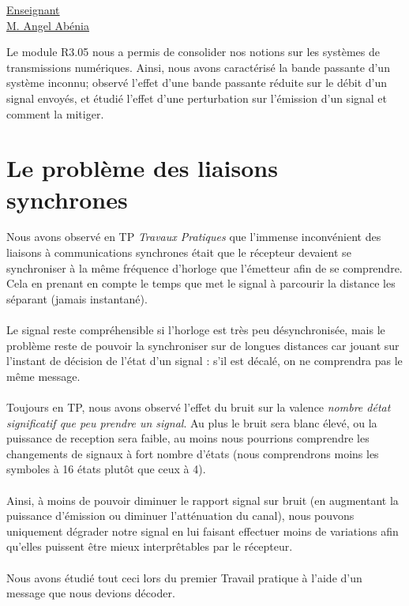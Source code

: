 \renewcommand{\figurename}{}

\vspace*{0.2cm}%
      \large
      \href{}{\color{black}Enseignant\\M. Angel Abénia}\\%
      \normalsize
\vspace*{0.5cm}%

Le module R3.05 nous a permis de consolider nos notions sur les systèmes de transmissions numériques. Ainsi, nous avons caractérisé la bande passante d'un système inconnu; observé l'effet d'une bande passante réduite sur le débit d'un signal envoyés, et étudié l'effet d'une perturbation sur l'émission d'un signal et comment la mitiger.

\section{Le problème des liaisons synchrones}

Nous avons observé en TP \textit{Travaux Pratiques} que l'immense inconvénient des liaisons à communications synchrones était que le récepteur devaient se synchroniser à la même fréquence d'horloge que l’émetteur afin de se comprendre. Cela en prenant en compte le temps que met le signal à parcourir la distance les séparant (jamais instantané).
\\ \\
Le signal reste compréhensible si l'horloge est très peu désynchronisée, mais le problème reste de pouvoir la synchroniser sur de longues distances car jouant sur l'instant de décision de l'état d'un signal : s'il est décalé, on ne comprendra pas le même message.
\\ \\
Toujours en TP, nous avons observé l'effet du bruit sur la valence \textit{nombre détat significatif que peu prendre un signal}. Au plus le bruit sera blanc élevé, ou la puissance de reception sera faible, au moins nous pourrions comprendre les changements de signaux à fort nombre d'états (nous comprendrons moins les symboles à 16 états plutôt que ceux à 4).
\\ \\
Ainsi, à moins de pouvoir diminuer le rapport signal sur bruit (en augmentant la puissance d'émission ou diminuer l'atténuation du canal), nous pouvons uniquement dégrader notre signal en lui faisant effectuer moins de variations afin qu'elles puissent être mieux interprêtables par le récepteur.
\\ \\
Nous avons étudié tout ceci lors du premier Travail pratique à l'aide d'un message que nous devions décoder.


